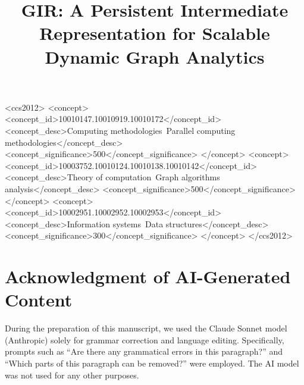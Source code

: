 \documentclass[sigplan,10pt,screen,review,anonymous]{acmart}
\newcommand{\name}{\textsc{GIR}}
\begin{document}
\title{\name: A Persistent Intermediate Representation for Scalable Dynamic Graph Analytics}

\begin{abstract}

\end{abstract}

\begin{CCSXML}
<ccs2012>
   <concept>
       <concept_id>10010147.10010919.10010172</concept_id>
       <concept_desc>Computing methodologies~Parallel computing methodologies</concept_desc>
       <concept_significance>500</concept_significance>
   </concept>
   <concept>
       <concept_id>10003752.10010124.10010138.10010142</concept_id>
       <concept_desc>Theory of computation~Graph algorithms analysis</concept_desc>
       <concept_significance>500</concept_significance>
   </concept>
   <concept>
       <concept_id>10002951.10002952.10002953</concept_id>
       <concept_desc>Information systems~Data structures</concept_desc>
       <concept_significance>300</concept_significance>
   </concept>
</ccs2012>
\end{CCSXML}



\maketitle







% 







\balance




\section*{Acknowledgment of AI-Generated Content}
During the preparation of this manuscript, we used the Claude Sonnet model (Anthropic) solely for grammar correction and language editing. Specifically, prompts such as ``Are there any grammatical errors in this paragraph?'' and ``Which parts of this paragraph can be removed?'' were employed. The AI model was not used for any other purposes.
\end{document}
